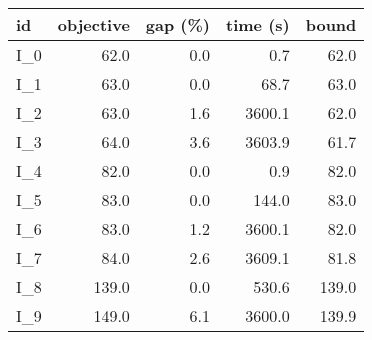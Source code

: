 \begin{tabular}{lrrrr}
\toprule
   id &  objective &  gap (\%) &  time (s) &  bound \\
\midrule
 I\_0 &       62.0 &       0.0 &       0.7 &   62.0 \\
 I\_1 &       63.0 &       0.0 &      68.7 &   63.0 \\
 I\_2 &       63.0 &       1.6 &    3600.1 &   62.0 \\
 I\_3 &       64.0 &       3.6 &    3603.9 &   61.7 \\
 I\_4 &       82.0 &       0.0 &       0.9 &   82.0 \\
 I\_5 &       83.0 &       0.0 &     144.0 &   83.0 \\
 I\_6 &       83.0 &       1.2 &    3600.1 &   82.0 \\
 I\_7 &       84.0 &       2.6 &    3609.1 &   81.8 \\
 I\_8 &      139.0 &       0.0 &     530.6 &  139.0 \\
 I\_9 &      149.0 &       6.1 &    3600.0 &  139.9 \\
\bottomrule
\end{tabular}
